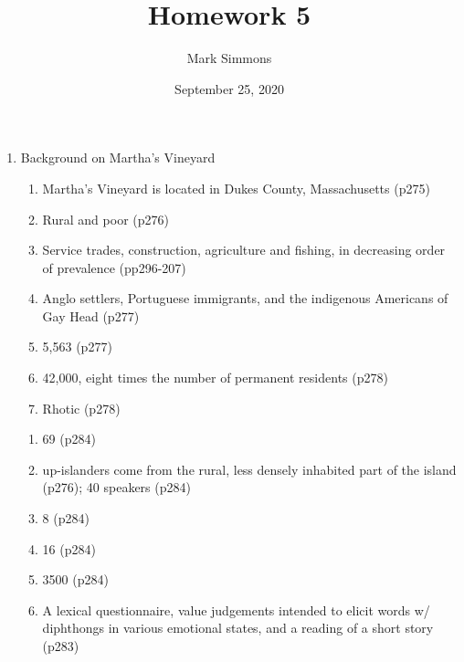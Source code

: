 \documentclass[12pt]{article}
\title{Homework 5}
\author{Mark Simmons}
\date{September 25, 2020}
\begin{document}
\maketitle

\begin{enumerate}
    \item Background on Martha's Vineyard
          \begin{enumerate}
              \item Martha's Vineyard is located in Dukes County, Massachusetts (p275)
              \item Rural and poor (p276)
              \item Service trades, construction, agriculture and fishing, in decreasing order of prevalence (pp296-207)
              \item Anglo settlers, Portuguese immigrants, and the indigenous Americans of Gay Head (p277)
              \item 5,563 (p277)
              \item 42,000, eight times the number of permanent residents (p278)
              \item Rhotic (p278)
          \end{enumerate}

          \begin{enumerate}
              \item 69 (p284)
              \item up-islanders come from the rural, less densely inhabited part of the island (p276); 40 speakers (p284)
              \item 8 (p284)
              \item 16 (p284)
              \item 3500 (p284)
              \item A lexical questionnaire, value judgements intended to elicit words w/ diphthongs in various emotional states,
                    and a reading of a short story (p283)
          \end{enumerate}


\end{enumerate}
\end{document}

